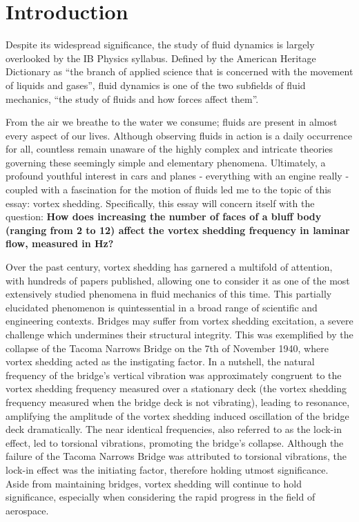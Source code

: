 \section*{Introduction}
Despite its widespread significance, the study of fluid dynamics is largely overlooked by the IB Physics syllabus. Defined by the American Heritage Dictionary as “the branch of applied science that is concerned with the movement of liquids and gases”, fluid dynamics is one of the two subfields of fluid mechanics, “the study of fluids and how forces affect them”.

From the air we breathe to the water we consume; fluids are present in almost every aspect of our lives. Although observing fluids in action is a daily occurrence for all, countless remain unaware of the highly complex and intricate theories governing these seemingly simple and elementary phenomena. Ultimately, a profound youthful interest in cars and planes - everything with an engine really - coupled with a fascination for the motion of fluids led me to the topic of this essay: vortex shedding. Specifically, this essay will concern itself with the question: \textbf{How does increasing the number of faces of a bluff body (ranging from 2 to 12) affect the vortex shedding frequency in laminar flow, measured in Hz?}

Over the past century, vortex shedding has garnered a multifold of attention, with hundreds of papers published, allowing one to consider it as one of the most extensively studied phenomena in fluid mechanics of this time. This partially elucidated phenomenon is quintessential in a broad range of scientific and engineering contexts. Bridges may suffer from vortex shedding excitation, a severe challenge which undermines their structural integrity. This was exemplified by the collapse of the Tacoma Narrows Bridge on the 7th of November 1940, where vortex shedding acted as the instigating factor. In a nutshell, the natural frequency of the bridge’s vertical vibration was approximately congruent to the vortex shedding frequency measured over a stationary deck (the vortex shedding frequency measured when the bridge deck is not vibrating), leading to resonance, amplifying the amplitude of the vortex shedding induced oscillation of the bridge deck dramatically. The near identical frequencies, also referred to as the lock-in effect, led to torsional vibrations, promoting the bridge’s collapse. Although the failure of the Tacoma Narrows Bridge was attributed to torsional vibrations, the lock-in effect was the initiating factor, therefore holding utmost significance. Aside from maintaining bridges, vortex shedding will continue to hold significance, especially when considering the rapid progress in the field of aerospace.


